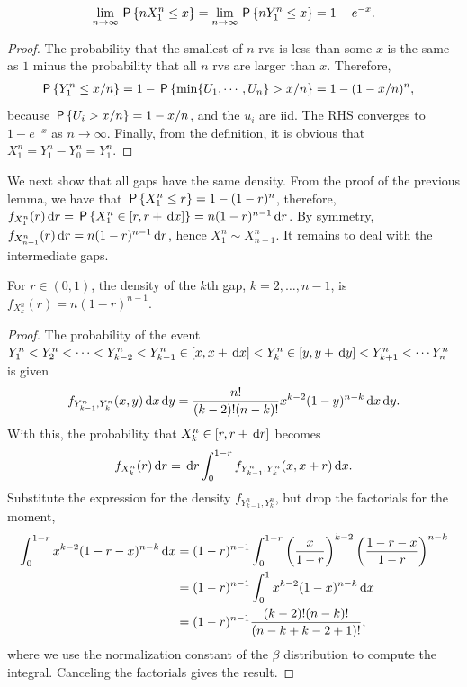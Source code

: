 \documentclass[queueing-book.tex]{subfiles}
\begin{document}
\begin{lemma}
\begin{equation*}
\lim_{n\to\infty} \P{n X^n_1 \leq x} = \lim_{n\to\infty} \P{n Y^n_1 \leq x} =1- e^{-x}.
\end{equation*}
\end{lemma}
\begin{proof}
The probability that the smallest of $n$ rvs is less than some $x$ is the same as $1$ minus the probability that all $n$ rvs are larger than $x$.
Therefore,
\begin{align*}
  \P{ Y^n_1 \leq x/n}
  &= 1 -  \P{\min\{U_{1}, \cdots, U_{n}\} > x/n} = 1 - (1-x/n)^{n},
\end{align*}
because $\P{U_{i} > x/n} = 1-x/n$, and the $u_{i}$ are iid.
The RHS converges to $1-e^{-x}$ as $n\to \infty$.
Finally, from the definition, it is obvious that $X_1^n = Y_1^n - Y_0^{n} = Y_1^{n}$.
\end{proof}


We next show that all gaps have the same density.
From the proof of the previous lemma, we have that $\P{X_1^n \leq r} = 1- (1-r)^{n}$, therefore, $f_{X_{1}^{n}}(r) \d r = \P{X_1^n \in [r, r + \d x]} = n (1-r)^{n-1} \d r$.
By symmetry, $f_{X_{n+1}^{n}}(r) \d r = n(1-r)^{n-1} \d r$,  hence $X_1^n \sim X_{n+1}^{n}$. It remains to deal with the intermediate gaps.

\begin{lemma}
For $r\in (0, 1)$, the density of the $k$th gap, $k=2, \ldots, n-1$,  is $f_{X_{k}^n}(r) = n (1-r)^{n-1}$.
\end{lemma}
\begin{proof}
The probability of the event $Y_1^n < Y_2^n < \cdots < Y_{k-2}^n < Y_{k-1}^n \in [x, x+ \d x] < Y_k^n \in [y, y+\d y] < Y_{k+1}^{n} < \cdots Y_n^{n}$ is given
\begin{align*}
  f_{Y_{k-1}^n, Y_k^n}(x, y) \d x \d y = \frac{n!}{(k-2)!(n-k)!} x^{k-2} (1-y)^{n-k} \d x \d y.
\end{align*}
With this, the probability that $X_k^{n} \in [r, r+\d r]$ becomes
\begin{align*}
  f_{X_{k}^n}(r) \d r = \d r \int_{0}^{1-r}  f_{Y_{k-1}^n, Y_k^n}(x, x+r) \d x.
\end{align*}
Substitute the expression for the density $f_{Y_{k-1}^n, Y_k^n}$, but drop the factorials for the moment,
\begin{align*}
 \int_{0}^{1-r}  x^{k-2} (1-r-x)^{n-k} \d x
  &= (1-r)^{n-1}\int_0^{1-r} \left(\frac{x}{1-r}\right)^{k-2} \left( \frac{1-r - x}{1-r}\right)^{n-k} \\
  &= (1-r)^{n-1}\int_0^1 x^{k-2}(1-x)^{n-k} \d x \\
  &= (1-r)^{n-1} \frac{(k-2)!(n-k)!}{(n-k + k-2 + 1)!},
\end{align*}
where we use the normalization constant of  the $\beta$ distribution to compute the integral. Canceling the factorials gives the result.
\end{proof}
\end{document}
